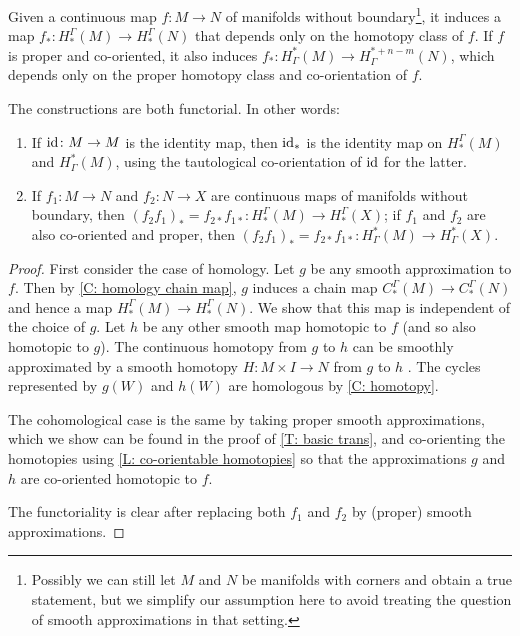\begin{theorem}\label{T: homology homotopy functor}
	Given a \textnormal{continuous} map $f \colon M \to N$ of manifolds without boundary\footnote{Possibly we can still let $M$ and $N$ be manifolds with corners and obtain a true statement, but we simplify our assumption here to avoid treating the question of smooth approximations in that setting.}, it induces a map $f_* \colon H_*^\Gamma(M) \to H_*^\Gamma(N)$ that depends only on the homotopy class of $f$.
	If $f$ is proper and co-oriented, it also induces $f_* \colon H^*_\Gamma(M) \to H^{*+n-m}_\Gamma(N)$, which depends only on the proper homotopy class and co-orientation of $f$.

	The constructions are both functorial.
	In other words:
	\begin{enumerate}
		\item If $\mathrm{id} \colon M \to M$ is the identity map, then $\mathrm{id}_*$ is the identity map on $H_*^\Gamma(M)$ and $H^*_\Gamma(M)$, using the tautological co-orientation of $\mathrm{id}$ for the latter.
		\item If $f_1 \colon M \to N$ and $f_2 \colon N \to X$ are continuous maps of manifolds without boundary, then $(f_2f_1)_* = f_{2*}f_{1*} \colon H_*^\Gamma(M) \to H_*^\Gamma(X)$; if $f_1$ and $f_2$ are also co-oriented and proper, then $(f_2f_1)_* = f_{2*}f_{1*} \colon H^*_\Gamma(M) \to H^*_\Gamma(X)$.
	\end{enumerate}
\end{theorem}

\begin{proof}
	First consider the case of homology.
	Let $g$ be any smooth approximation to $f$.
	Then by \cref{C: homology chain map}, $g$ induces a chain map $C_*^\Gamma(M) \to C_*^\Gamma(N)$ and hence a map $H_*^\Gamma(M) \to H_*^\Gamma(N)$.
	We show that this map is independent of the choice of $g$.
	Let $h$ be any other smooth map homotopic to $f$ (and so also homotopic to $g$).
	The continuous homotopy from $g$ to $h$ can be smoothly approximated by a smooth homotopy $H \colon M \times I \to N$ from $g$ to $h$ \cite[Theorem III.2.5]{Kos93}.
	The cycles represented by $g(W)$ and $h(W)$ are homologous by \cref{C: homotopy}.


	The cohomological case is the same by taking proper smooth approximations, which we show can be found in the proof of \cref{T: basic trans}, and co-orienting the homotopies using \cref{L: co-orientable homotopies} so that the approximations $g$ and $h$ are co-oriented homotopic to $f$.

	The functoriality is clear after replacing both $f_1$ and $f_2$ by (proper) smooth approximations.
\end{proof}

